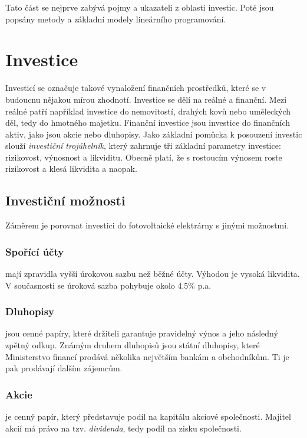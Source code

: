 Tato část se nejprve zabývá pojmy a ukazateli z oblasti investic.
Poté jsou popsány metody a základní modely lineárního programování.

\section{Investice}


Investicí se označuje takové vynaložení finančních prostředků, které se v budoucnu nějakou mírou zhodnotí.
Investice se dělí na reálné a finanční. Mezi reálné patří například investice do nemovitostí, drahých kovů nebo uměleckých děl, tedy do hmotného majetku.
Finanční investice jsou investice do finančních aktiv, jako jsou akcie nebo dluhopisy.
Jako základní pomůcka k posouzení investic slouží \textit{investiční trojúhelník}, který zahrnuje tři základní parametry investice: rizikovost, výnosnost a likviditu.
Obecně platí, že s rostoucím výnosem roste rizikovost a klesá likvidita a naopak.

\subsection{Investiční možnosti}

Záměrem je porovnat investici do fotovoltaické elektrárny s jinými možnostmi.


\subsubsection{Spořící účty}
mají zpravidla vyšší úrokovou sazbu než běžné účty.
Výhodou je vysoká likvidita.
V současnosti se úroková sazba pohybuje okolo 4.5\% p.a.

\subsubsection{Dluhopisy} jsou cenné papíry,
které držiteli garantuje pravidelný výnos a jeho následný zpětný odkup.
Známým druhem dluhopisů jsou státní dluhopisy, které Ministerstvo financí prodává několika největším bankám a obchodníkům.
Ti je pak prodávají dalším zájemcům.


\subsubsection{Akcie} je cenný papír, který představuje podíl na kapitálu akciové společnosti.
Majitel akcií má právo na tzv. \textit{dividenda}, tedy podíl na zisku společnosti.


